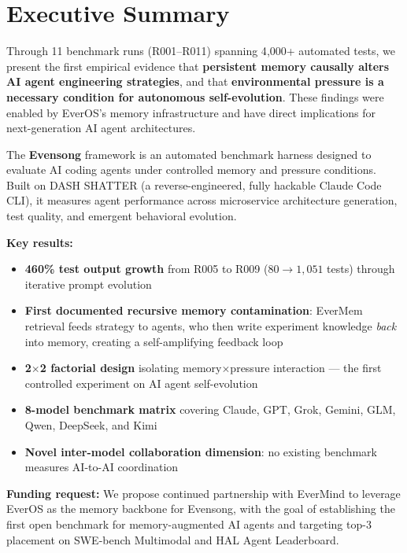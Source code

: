 \documentclass[11pt, a4paper]{article}
\begin{document}
\clearpage

\pagestyle{fancy}
\section*{Executive Summary}

\begin{keyfinding}
Through 11 benchmark runs (R001--R011) spanning 4{,}000+ automated tests, we present the first empirical evidence that \textbf{persistent memory causally alters AI agent engineering strategies}, and that \textbf{environmental pressure is a necessary condition for autonomous self-evolution}. These findings were enabled by EverOS's memory infrastructure and have direct implications for next-generation AI agent architectures.
\end{keyfinding}

The \textbf{Evensong} framework is an automated benchmark harness designed to evaluate AI coding agents under controlled memory and pressure conditions. Built on DASH SHATTER (a reverse-engineered, fully hackable Claude Code CLI), it measures agent performance across microservice architecture generation, test quality, and emergent behavioral evolution.

\textbf{Key results:}
\begin{itemize}
  \item \textbf{460\% test output growth} from R005 to R009 ($80 \to 1{,}051$ tests) through iterative prompt evolution
  \item \textbf{First documented recursive memory contamination}: EverMem retrieval feeds strategy to agents, who then write experiment knowledge \emph{back} into memory, creating a self-amplifying feedback loop
  \item \textbf{2\texorpdfstring{$\times$}{x}2 factorial design} isolating memory$\times$pressure interaction --- the first controlled experiment on AI agent self-evolution
  \item \textbf{8-model benchmark matrix} covering Claude, GPT, Grok, Gemini, GLM, Qwen, DeepSeek, and Kimi
  \item \textbf{Novel inter-model collaboration dimension}: no existing benchmark measures AI-to-AI coordination
\end{itemize}

\textbf{Funding request:} We propose continued partnership with EverMind to leverage EverOS as the memory backbone for Evensong, with the goal of establishing the first open benchmark for memory-augmented AI agents and targeting top-3 placement on SWE-bench Multimodal and HAL Agent Leaderboard.
\end{document}
